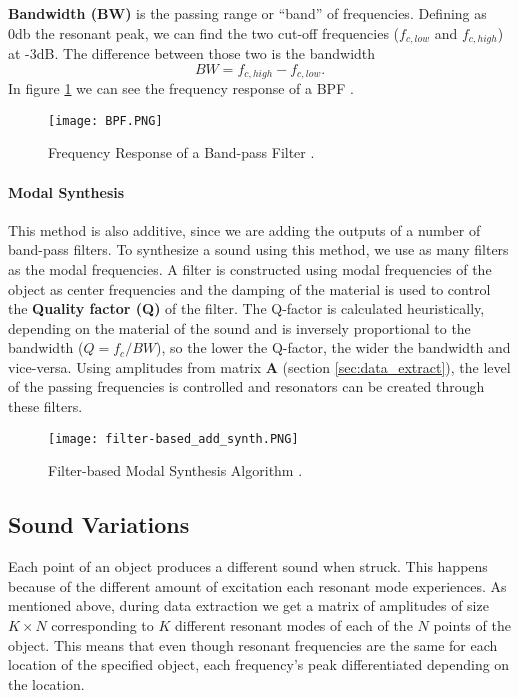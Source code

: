 \textbf{Bandwidth (BW)} is the passing range or ``band'' of frequencies. Defining as 0db the resonant peak, we can find the two cut-off frequencies ($f_{c,low}$ and $f_{c,high}$) at -3dB. The difference between those two is the bandwidth  
\begin{equation}\label{eq:bw}
BW = f_{c,high}-f_{c,low}.
\end{equation}   
In figure \ref{fig:resp_bpf} we can see the frequency response of a BPF \cite{bib:bpf}. 

\begin{figure}[H]
  \centering
    \texttt{[image: BPF.PNG]}
      \caption{Frequency Response of a Band-pass Filter  \cite{bib:bpf}.}
      \label{fig:resp_bpf}
\end{figure}

\paragraph{Modal Synthesis\\}\label{par:synth}

This method is also additive, since we are adding the outputs of a number of band-pass filters. To synthesize a sound using this method, we use as many filters as the modal frequencies. A filter is constructed using modal frequencies of the object as center frequencies and the damping of the material is used to control the \textbf{Quality factor (Q)} of the filter.  The Q-factor is calculated heuristically, depending on the material of the sound and is inversely proportional to the bandwidth ($Q=f_c/BW$), so the lower the Q-factor, the wider the bandwidth and vice-versa. Using amplitudes from matrix \textbf{A} (section \ref{sec:data_extract}), the level of the passing frequencies is controlled and resonators can be created through these filters. 

\begin{figure}[H]
  \centering
    \texttt{[image: filter-based\_add\_synth.PNG]}
      \caption{Filter-based Modal Synthesis Algorithm \cite{Cook:2002:RSS:515316}.}
      \label{fig:filter_synth}
\end{figure}

\subsection{Sound Variations} \label{sec:sound_variation}
Each point of an object produces a different sound when struck. This happens because of the different amount of excitation each resonant mode experiences. As mentioned above, during data extraction we get a matrix of amplitudes of size $K\times N$ corresponding to $K$ different resonant modes of each of the $N$ points of the object. This means that even though resonant frequencies are the same for each location of the specified object, each frequency's peak differentiated depending on the location.

